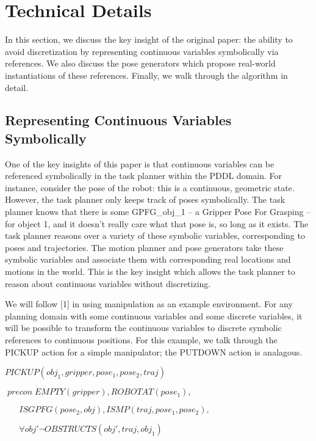 \documentclass[12pt]{article}
\begin{document}
\section{Technical Details}

In this section, we discuss the key insight of the original paper: the ability to avoid discretization by representing continuous variables symbolically via references.  
We also discuss the pose generators which propose real-world instantiations of these references.  
Finally, we walk through the algorithm in detail.

\subsection{Representing Continuous Variables Symbolically}

One of the key insights of this paper is that continuous variables can be referenced symbolically in the task planner within the PDDL domain.  
For instance, consider the pose of the robot: this is a continuous, geometric state.  However, the task planner only keeps track of poses symbolically.  
The task planner knows that there is some GPFG\_obj\_1 -- a Gripper Pose For Grasping -- for object 1, and it doesn't really care what that pose is, so long as it exists.  
The task planner reasons over a variety of these symbolic variables, corresponding to poses and trajectories.  
The motion planner and pose generators take these symbolic variables and associate them with corresponding real locations and motions in the world.  
This is the key insight which allows the task planner to reason about continuous variables without discretizing.  

We will follow [1] in using manipulation as an example environment.  For any planning domain with some continuous variables and some discrete variables, it will be possible to transform the continuous variables to discrete symbolic references to continuous positions.  For this example, we talk through the PICKUP action for a simple manipulator; the PUTDOWN action is analagous.


\vspace{10}
$PICKUP(obj_1, gripper, pose_1, pose_2, traj)$

$\; precon \; EMPTY(gripper), ROBOTAT(pose_1), $

$\; \; \;\; \; \; ISGPFG(pose_2, obj), ISMP(traj, pose_1, pose_2), $

$\; \; \; \; \; \;\forall obj' \neg OBSTRUCTS(obj', traj, obj_1)$
\end{document}

